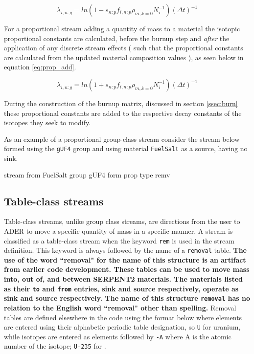 \begin{equation}\label{eq:prop_remv}
\lambda_{i,n:g} = ln(1 - s_{n:p} f_{i,n:p} \rho_{m,k=0} N_{i}^{-1})
    (\Delta t)^{-1}
\end{equation}

For a proportional stream adding a quantity of mass to a material the isotopic
proportional constants are calculated, before the burnup step
and \textit{after} the application of any discrete stream effects ( such that
the proportional constants are calculated from the updated material composition
values ), as seen below in equation \ref{eq:prop_add}.

\begin{equation}\label{eq:prop_add}
\lambda_{i,n:g} = ln(1 + s_{n:p} f_{i,n:p} \rho_{m,k=0} N_{i}^{-1})
    (\Delta t)^{-1}
\end{equation}

During the construction of the burnup matrix, discussed in section
\ref{ssec:burn} these proportional constants are
added to the respective decay constants of the isotopes they seek to modify.

As an example of a proportional group-class stream consider the stream below
formed using the \texttt{gUF4} group and using material \texttt{FuelSalt} as a
source, having no sink.

\begin{li}
stream from FuelSalt group gUF4 form prop type remv
\end{li}

\subsection{Table-class streams}\label{ssec:rem}
Table-class streams, unlike group class streams, are directions from the user to
ADER to move a specific quantity of mass in a specific manner. A stream is
classified as a table-class stream when the keyword \texttt{rem} is used in
the stream definition. This keyword is always followed by the name of 
a \texttt{removal} table. \textbf{The use of the word ``removal" for the name
of this structure is an artifact from earlier code development. These tables
can be used to move mass into, out of, and between SERPENT2 materials. The
materials listed as their \texttt{to} and \texttt{from} entries, sink and
source respectively, operate as sink and source respectively. The name of this
structure \texttt{removal} has no relation to the English word ``removal" other
than spelling.} Removal tables are defined elsewhere in the code using the
format below where elements are entered using their alphabetic periodic table
designation, so \texttt{U} for uranium, while isotopes are entered as elements
followed by \texttt{-A} where A is the atomic number of the isotope; 
\texttt{U-235} for .

